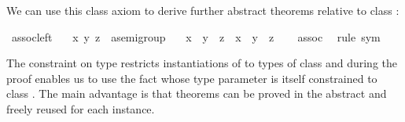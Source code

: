 \begin{isabellebody}
\begin{isamarkuptext}
We can use this class axiom to derive further abstract theorems
relative to class :%
\end{isamarkuptext}%
\isamarkuptrue%
\isamarkupfalse%
\ assoc{\isacharunderscore}left{\isacharcolon}\isanewline
\ \ \ x\ y\ z\ {\isacharcolon}{\isacharcolon}\ {\isachardoublequoteopen}{\isacharprime}a{\isasymColon}semigroup{\isachardoublequoteclose}\isanewline
\ \ \ {\isachardoublequoteopen}x\ {\isasymoplus}\ {\isacharparenleft}y\ {\isasymoplus}\ z{\isacharparenright}\ {\isacharequal}\ {\isacharparenleft}x\ {\isasymoplus}\ y{\isacharparenright}\ {\isasymoplus}\ z{\isachardoublequoteclose}\isanewline
%
\isadelimproof
\ \ %
\endisadelimproof
%
\isatagproof
{}\isamarkupfalse%
\ assoc\ \isamarkupfalse%
\ {\isacharparenleft}rule\ sym{\isacharparenright}%
\endisatagproof
{\isafoldproof}%
%
\isadelimproof
%
\endisadelimproof
%
\begin{isamarkuptext}%
\noindent The  constraint on type  restricts instantiations of  to types of class
 and during the proof enables us to use the fact
\hyperlink{fact.assoc}{\mbox{}} whose type parameter is itself constrained to class
.  The main advantage is that theorems can be proved
in the abstract and freely reused for each instance.


\end{isamarkuptext}
\end{isabellebody}
